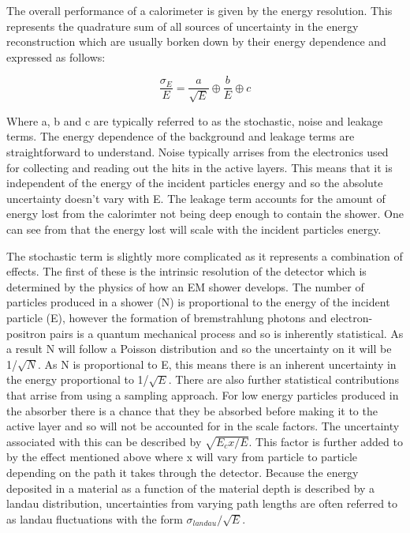 The overall performance of a calorimeter is given by the energy resolution. This represents the quadrature sum of all sources of uncertainty in the energy reconstruction which are usually borken down by their energy dependence and expressed as follows:

\begin{equation}
  \frac{\sigma_E}{E}=\frac{a}{\sqrt{E}} \oplus \frac{b}{E} \oplus c
\end{equation}

Where a, b and c are typically referred to as the stochastic, noise and leakage terms. The energy dependence of the background and leakage terms are straightforward to understand. Noise typically arrises from the electronics used for collecting and reading out the hits in the active layers. This means that it is independent of the energy of the incident particles energy and so the absolute uncertainty doesn't vary with E. The leakage term accounts for the amount of energy lost from the calorimter not being deep enough to contain the shower. One can see from  that the energy lost will scale with the incident particles energy.

The stochastic term is slightly more complicated as it represents a combination of effects. The first of these is the intrinsic resolution of the detector which is determined by the physics of how an \ac{EM} shower develops. The number of particles produced in a shower (N)  is proportional to the energy of the incident particle (E), however the formation of bremstrahlung photons and electron-positron pairs is a quantum mechanical process and so is inherently statistical. As a result N will follow a Poisson distribution and so the uncertainty on it will be 1/$\sqrt{N}$. As N is proportional to E, this means there is an inherent uncertainty in the energy proportional to 1/$\sqrt{E}$. There are also further statistical contributions that arrise from using a sampling approach. For low energy particles produced in the absorber there is a chance that they be absorbed before making it to the active layer and so will not be accounted for in the scale factors. The uncertainty associated with this can be described by $\sqrt{E_{c}x/E}$. This factor is further added to by the effect mentioned above where x will vary from particle to particle depending on the path it takes through the detector. Because the energy deposited in a material as a function of the material depth is described by a landau distribution, uncertainties from varying path lengths are often referred to as landau fluctuations with the form $\sigma_{landau}/\sqrt{E}$.

